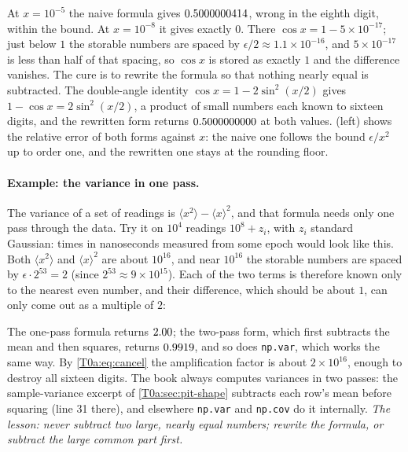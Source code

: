 
At $x=10^{-5}$ the naive formula gives $0.5000000414$, wrong in the eighth digit, within the bound. At $x=10^{-8}$ it gives exactly $0$. There $\cos x=1-5\times10^{-17}$; just below $1$ the storable numbers are spaced by $\epsilon/2\approx1.1\times10^{-16}$, and $5\times10^{-17}$ is less than half of that spacing, so $\cos x$ is stored as exactly $1$ and the difference vanishes. The cure is to rewrite the formula so that nothing nearly equal is subtracted. The double-angle identity $\cos x=1-2\sin^2(x/2)$ gives $1-\cos x=2\sin^2(x/2)$, a product of small numbers each known to sixteen digits, and the rewritten form returns $0.5000000000$ at both values.  (left) shows the relative error of both forms against $x$: the naive one follows the bound $\epsilon/x^2$ up to order one, and the rewritten one stays at the rounding floor.

\paragraph{Example: the variance in one pass.} The variance of a set of readings is $\langle x^2\rangle-\langle x\rangle^2$, and that formula needs only one pass through the data. Try it on $10^4$ readings $10^8+z_i$, with $z_i$ standard Gaussian: times in nanoseconds measured from some epoch would look like this. Both $\langle x^2\rangle$ and $\langle x\rangle^2$ are about $10^{16}$, and near $10^{16}$ the storable numbers are spaced by $\epsilon\cdot2^{53}=2$ (since $2^{53}\approx9\times10^{15}$). Each of the two terms is therefore known only to the nearest even number, and their difference, which should be about $1$, can only come out as a multiple of $2$:


The one-pass formula returns $2.00$; the two-pass form, which first subtracts the mean and then squares, returns $0.9919$, and so does \texttt{np.var}, which works the same way. By \eqref{T0a:eq:cancel} the amplification factor is about $2\times10^{16}$, enough to destroy all sixteen digits. The book always computes variances in two passes: the sample-variance excerpt of \cref{T0a:sec:pit-shape} subtracts each row's mean before squaring (line 31 there), and elsewhere \texttt{np.var} and \texttt{np.cov} do it internally. \emph{The lesson: never subtract two large, nearly equal numbers; rewrite the formula, or subtract the large common part first.}

